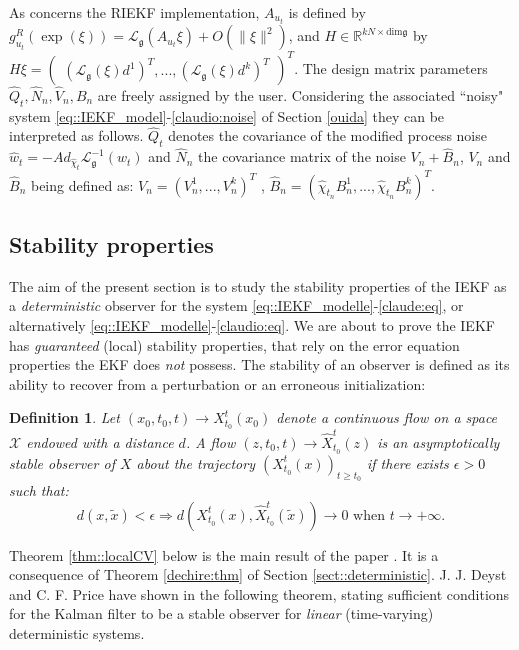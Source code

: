 \documentclass[a4paper,12pt,onecolumn]{article}
\newtheorem{defn}{Definition}
\newcommand{\RR}{{\mathbb{R}}}
\newcommand{\norm}[1]{\lVert#1\rVert}
\begin{document}
As concerns the RIEKF implementation, $A_{u_t}$ is defined by $g^R_{u_t}(\exp(\xi)) = \mathcal L_{\mathfrak{g}}(A_{u_t} \xi) + O (\norm{\xi}^2)$, and $H\in\RR^{kN\times\mathrm{dim}\mathfrak{g}}$ by $H\xi=
\begin{pmatrix}
\left( \mathcal{L}_{\mathfrak{g}} (\xi) d^1 \right)^T,
... ,
\left( \mathcal{L}_{\mathfrak{g}} (\xi) d^k  \right)^T
\end{pmatrix}^T$. The design matrix parameters $\hat Q_t, \hat{N}_n,\hat{V}_n, B_n$ are freely assigned by the user. Considering the associated ``noisy" system \eqref{eq::IEKF_model}-\eqref{claudio:noise} of Section \ref{ouida} they can be interpreted as follows. $\hat{Q}_t$ denotes the covariance of the modified process noise  $\hat{w}_t = - Ad_{\hat{\chi}_t} \mathcal{L}_{\mathfrak{g}}^{-1} (w_t)$  and $\hat{N}_n$ the covariance matrix of the noise ${V}_n+ \hat{B}_n$, ${V}_n$ and $\hat B_n$ being defined as:
 $ V_n = \left(  V_n^1, ... ,
 V_n^k \right)^T$ , $\hat B_n = \left(
 \hat{\chi}_{t_n}B_n^1 , ... ,  \hat{\chi}_{t_n}B_n^k \right)^T$.

\subsection{Stability properties}
The aim of the present section is to study the stability properties of the IEKF as a \emph{deterministic} observer for the system \eqref{eq::IEKF_modelle}-\eqref{claude:eq}, or alternatively \eqref{eq::IEKF_modelle}-\eqref{claudio:eq}.  We are about to prove the IEKF has  \emph{guaranteed} (local) stability properties, that  rely on the error equation properties   the  EKF does \emph{not} possess. The stability of an observer is defined as its ability to recover from a perturbation or an erroneous initialization:
\begin{defn}\label{deff}
Let $(x_0,t_0,t) \rightarrow X_{t_0}^t(x_0)$ denote a continuous flow on a space $\mathcal{X}$ endowed with a distance $d$. A flow $(z,t_0,t) \rightarrow \hat{X}_{t_0}^t(z)$ is an asymptotically stable observer of $X$ about the trajectory $\left( {X}_{t_0}^t ({x}) \right)_{t\geq t_0}$  if there exists $\epsilon>0$ such that:
\[
d \left( x, \tilde{x} \right) <\epsilon \Rightarrow   d \left( X_{t_0}^t (x),\hat{X}_{t_0}^t (\tilde{x}) \right) \rightarrow 0 \text{ when }t\to + \infty.
\]
\end{defn}
Theorem \ref{thm::localCV} below is the main result of the paper . It is a consequence of Theorem \ref{dechire:thm} of Section \ref{sect::deterministic}.  
J. J. Deyst and C. F. Price have shown in \cite{deyst} the following theorem, stating sufficient conditions for the Kalman filter to be a stable observer for \emph{linear} (time-varying) deterministic systems.
\end{document}
